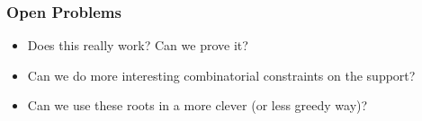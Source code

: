 \documentclass{beamer}
\begin{document}
\begin{frame}
    \frametitle{Open Problems}
    \begin{itemize}
        \item Does this really work? Can we prove it?
        \item Can we do more interesting combinatorial constraints on the support?
        \item Can we use these roots in a more clever (or less greedy way)?
    \end{itemize}
\end{frame}
%
%
\end{document}
